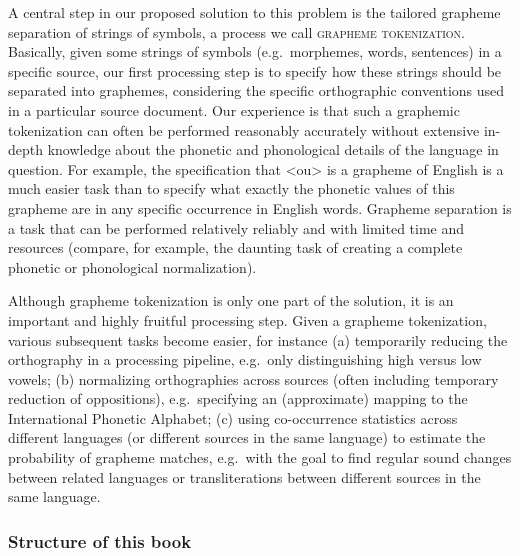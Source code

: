 
A central step in our proposed solution to this problem is the tailored grapheme
separation of strings of symbols, a process we call \textsc{grapheme
tokenization}. Basically, given some strings of symbols (e.g.~morphemes, words,
sentences) in a specific source, our first processing step is to specify how
these strings should be separated into graphemes, considering the specific
orthographic conventions used in a particular source document. Our experience is
that such a graphemic tokenization can often be performed reasonably accurately
without extensive in-depth knowledge about the phonetic and phonological details
of the language in question. For example, the specification that <ou> is a
grapheme of English is a much easier task than to specify what exactly the
phonetic values of this grapheme are in any specific occurrence in English
words. Grapheme separation is a task that can be performed relatively reliably
and with limited time and resources (compare, for example, the
daunting task of creating a complete phonetic or phonological normalization).

Although grapheme tokenization is only one part of the solution, it is an
important and highly fruitful processing step. Given a grapheme tokenization,
various subsequent tasks become easier, for instance (a) temporarily reducing the
orthography in a processing pipeline, e.g.~only distinguishing high versus low
vowels; (b) normalizing orthographies across sources (often including temporary
reduction of oppositions), e.g.~specifying an (approximate) mapping to the
International Phonetic Alphabet; (c) using co-occurrence statistics across
different languages (or different sources in the same language) to estimate the
probability of grapheme matches, e.g.~with the goal to find regular sound
changes between related languages or transliterations between different sources
in the same language.

\subsubsection*{Structure of this book}

